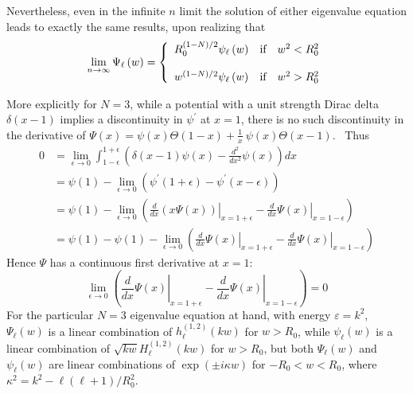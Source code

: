 \documentclass{article}%
\begin{document}
Nevertheless, even in the infinite $n$ limit the solution of either eigenvalue
equation leads to exactly the same results, upon realizing that
\begin{equation}
\lim_{n\rightarrow\infty}\Psi_{\ell}\left(  w\right)  =\left\{
\begin{array}
[c]{ccc}%
R_{0}^{\left(  1-N\right)  /2}\psi_{\ell}\left(  w\right)  & \text{if} &
w^{2}<R_{0}^{2}\\
&  & \\
w^{\left(  1-N\right)  /2}\psi_{\ell}\left(  w\right)  & \text{if} &
w^{2}>R_{0}^{2}%
\end{array}
\right.
\end{equation}


More explicitly for $N=3$, while a potential with a unit strength Dirac delta
$\delta\left(  x-1\right)  $ implies a discontinuity in $\psi^{\prime}$ at
$x=1$, there is no such discontinuity in the derivative of $\Psi\left(
x\right)  =\psi\left(  x\right)  \Theta\left(  1-x\right)  +\frac{1}{x}%
~\psi\left(  x\right)  \Theta\left(  x-1\right)  $. \ Thus
\begin{align}
0  &  =\lim_{\epsilon\rightarrow0}\int_{1-\epsilon}^{1+\epsilon}\left(
\delta\left(  x-1\right)  \psi\left(  x\right)  -\frac{d^{2}}{dx^{2}}%
\psi\left(  x\right)  \right)  dx\nonumber\\
&  =\psi\left(  1\right)  -\lim_{\epsilon\rightarrow0}\left(  \psi^{\prime
}\left(  1+\epsilon\right)  -\psi^{\prime}\left(  x-\epsilon\right)  \right)
\nonumber\\
&  =\psi\left(  1\right)  -\lim_{\epsilon\rightarrow0}\left(  \left.  \frac
{d}{dx}\left(  x\Psi\left(  x\right)  \right)  \right\vert _{x=1+\epsilon
}-\left.  \frac{d}{dx}\Psi\left(  x\right)  \right\vert _{x=1-\epsilon}\right)
\nonumber\\
&  =\psi\left(  1\right)  -\psi\left(  1\right)  -\lim_{\epsilon\rightarrow
0}\left(  \left.  \frac{d}{dx}\Psi\left(  x\right)  \right\vert _{x=1+\epsilon
}-\left.  \frac{d}{dx}\Psi\left(  x\right)  \right\vert _{x=1-\epsilon
}\right)
\end{align}
Hence $\Psi$ has a continuous first derivative at $x=1$:
\begin{equation}
\lim_{\epsilon\rightarrow0}\left(  \left.  \frac{d}{dx}\Psi\left(  x\right)
\right\vert _{x=1+\epsilon}-\left.  \frac{d}{dx}\Psi\left(  x\right)
\right\vert _{x=1-\epsilon}\right)  =0
\end{equation}
For the particular $N=3$ eigenvalue equation at hand, with energy
$\varepsilon=k^{2}$, $\Psi_{\ell}\left(  w\right)  $ is a linear combination
of $h_{\ell}^{\left(  1,2\right)  }\left(  kw\right)  $ for $w>R_{0}$, while
$\psi_{\ell}\left(  w\right)  $ is a linear combination of $\sqrt{kw}H_{\ell
}^{\left(  1,2\right)  }\left(  kw\right)  $ for $w>R_{0}$, but both
$\Psi_{\ell}\left(  w\right)  $ and $\psi_{\ell}\left(  w\right)  $ are linear
combinations of $\exp\left(  \pm i\kappa w\right)  $ for $-R_{0}<w<R_{0}$,
where $\kappa^{2}=k^{2}-\ell\left(  \ell+1\right)  /R_{0}^{2}$.
\end{document}
